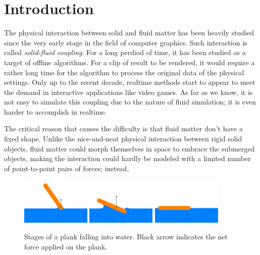 \section{Introduction}

The physical interaction between solid and fluid matter has been heavily studied since the very early stage in the field of computer graphics.
Such interaction is called \emph{solid-fluid coupling}.
For a long perdiod of time, it has been studied as a target of offline algorithms.
For a clip of result to be rendered, it would require a rather long time for the algorithm to process the original data of the physical settings.
Only up to the recent decade, realtime methods start to appear to meet the demand in interactive applications like video games\citationNeeded.
As far as we know, it is not easy to simulate this coupling due to the nature of fluid simulation;
it is even harder to accomplish in realtime.

The critical reason that causes the difficulty is that fluid matter don't have a fixed shape.
Unlike the nice-and-neat physical interaction between rigid solid objects, fluid matter could morph themselves in space to embrace the submerged objects, making the interaction could hardly be modeled with a limited number of point-to-point pairs of forces;
instead, 

\begin{figure}[h]
	\begin{center}
		\includegraphics[width=1.3in]{figures/stages-of-a-plank-falling-into-water/1.png}
		\includegraphics[width=1.3in]{figures/stages-of-a-plank-falling-into-water/2.png}
		\includegraphics[width=1.3in]{figures/stages-of-a-plank-falling-into-water/3.png}
	\end{center}
	\caption{
		Stages of a plank falling into water.
		Black arrow indicates the net force applied on the plank.
	}
	\label{stages-of-a-plank-falling-into-water}
\end{figure}

